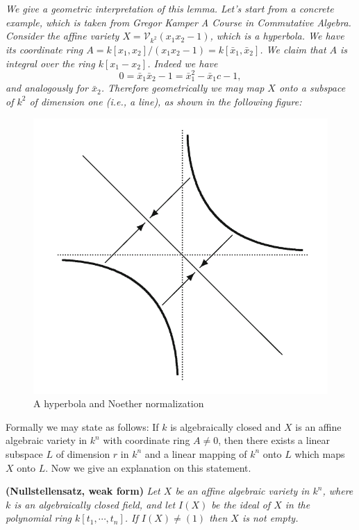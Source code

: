 \begin{note}\em
We give a geometric interpretation of this lemma. Let's start from a concrete example, which is taken from Gregor Kamper \textit{A Course in Commutative Algebra}. Consider the affine variety $X=\mathcal{V}_{k^2}(x_1x_2-1)$, which is a hyperbola. We have its coordinate ring $A=k[x_1,x_2]/(x_1x_2-1)=k[\bar{x}_1,\bar{x}_2]$. We claim that $A$ is integral over the ring $k[x_1-x_2]$. Indeed we have 
$$
0=\bar{x}_1\bar{x}_2-1=\bar{x}_{1}^{2}-\bar{x}_1c-1,
$$
and analogously for $\bar{x}_2$. Therefore geometrically we may map $X$ onto a subspace of $k^2$ of dimension one (i.e., a line), as shown in the following figure:
\begin{figure}[htbp]
    \center
    \includegraphics[scale=0.29]{Images/NoetherNormalizationLemma.png}
    \caption{A hyperbola and Noether normalization}
\end{figure}
Formally we may state as follows: If $k$ is algebraically closed and $X$ is an affine algebraic variety in $k^n$ with coordinate ring $A\ne 0$, then there exists a linear subspace $L$ of dimension $r$ in $k^n$ and a linear mapping of $k^n$ onto $L$ which maps $X$ onto $L$. Now we give an explanation on this statement.
\end{note}
\begin{problem}{\textbf{(Nullstellensatz, weak form)}}\em
Let $X$ be an affine algebraic variety in $k^n$, where $k$ is an algebraically closed field, and let $I(X)$ be the ideal of $X$ in the polynomial ring $k[t_1,\cdots,t_n]$. If $I(X)\ne (1)$ then $X$ is not empty.
\end{problem}
